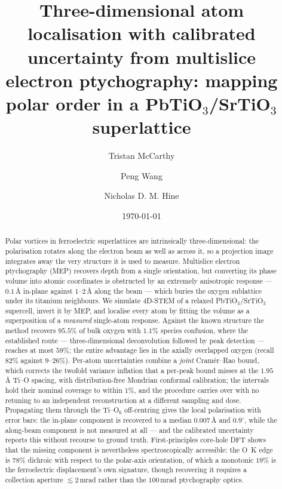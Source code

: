 \documentclass[aps,prb,twocolumn,superscriptaddress,floatfix,nofootinbib]{revtex4-2}
\begin{document}
\title{Three-dimensional atom localisation with calibrated uncertainty from multislice
electron ptychography: mapping polar order in a PbTiO$_3$/SrTiO$_3$ superlattice}

\author{Tristan McCarthy}
\author{Peng Wang}
\author{Nicholas D. M. Hine}

\date{\today}

\begin{abstract}
Polar vortices in ferroelectric superlattices are intrinsically three-dimensional: the
polarisation rotates along the electron beam as well as across it, so a projection image
integrates away the very structure it is used to measure. Multislice electron ptychography
(MEP) recovers depth from a single orientation, but converting its phase volume into atomic
coordinates is obstructed by an extremely anisotropic response --- $0.1$\,\AA{} in-plane
against $1$--$2$\,\AA{} along the beam --- which buries the oxygen sublattice under its
titanium neighbours. We simulate 4D-STEM of a relaxed PbTiO$_3$/SrTiO$_3$ supercell, invert it
by MEP, and localise every atom by fitting the volume as a superposition of a \emph{measured}
single-atom response. Against the known structure the method recovers $95.5\%$ of bulk oxygen
with $1.1\%$ species confusion, where the established route --- three-dimensional
deconvolution followed by peak detection --- reaches at most $59\%$; the entire advantage lies
in the axially overlapped oxygen (recall $82\%$ against $9$--$26\%$). Per-atom uncertainties
combine a \emph{joint} Cram\'er--Rao bound, which corrects the twofold variance inflation that
a per-peak bound misses at the $1.95$\,\AA{} Ti--O spacing, with distribution-free Mondrian
conformal calibration; the intervals hold their nominal coverage to within $1\%$, and the
procedure carries over with no retuning to an independent reconstruction at a different
sampling and dose. Propagating them
through the Ti--O$_6$ off-centring gives the local polarisation with error bars: the in-plane
component is recovered to a median $0.007$\,\AA{} and $0.9^\circ$, while the along-beam
component is not measured at all --- and the calibrated uncertainty reports this without
recourse to ground truth. First-principles core-hole DFT shows that the missing component is
nevertheless spectroscopically accessible: the O~K edge is $78\%$ dichroic with respect to the
polar-axis orientation, of which a monotonic $19\%$ is the ferroelectric displacement's own
signature, though recovering it requires a collection aperture $\lesssim2$\,mrad rather than
the $100$\,mrad ptychography optics.
\end{abstract}
\end{document}
